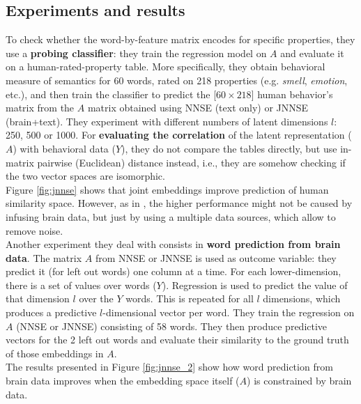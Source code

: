 \subsection{Experiments and results}
To check whether the word-by-feature matrix encodes for specific properties, they use a \textbf{probing classifier}: they train the regression model on $A$ and evaluate it on a human-rated-property table. More specifically, they obtain behavioral measure of semantics for 60 words, rated on 218 properties (e.g. \textit{smell}, \textit{emotion}, etc.), and then train the classifier to predict the [$60 \times 218$] human behavior's matrix from the $A$ matrix obtained using NNSE (text only) or JNNSE (brain+text). They experiment with different numbers of latent dimensions $l$: 250, 500 or 1000. For \textbf{evaluating the correlation} of the latent representation ($A$) with behavioral data ($Y$), they do not compare the tables directly, but use in-matrix pairwise (Euclidean) distance instead, i.e., they are somehow checking if the two vector spaces are isomorphic.\\
Figure \ref{fig:jnnse} shows that joint embeddings improve prediction of human similarity space. However, as in \cite{fong2017using}, the higher performance might not be caused by infusing brain data, but just by using a multiple data sources, which allow to remove noise.\\

Another experiment they deal with consists in \textbf{word prediction from brain data}. The matrix $A$ from NNSE or JNNSE is used as outcome variable: they predict it (for left out words) one column at a time. For each lower-dimension, there is a set of values over words ($Y$).
Regression is used to predict the value of that dimension $l$ over the $Y$ words. This is repeated for all $l$ dimensions, which produces a predictive $l$-dimensional vector per word. They train the regression on $A$ (NNSE or JNNSE) consisting of 58 words. They then produce predictive vectors for the 2 left out words and evaluate their similarity to the ground truth of those embeddings in $A$.\\
The results presented in Figure \ref{fig:jnnse_2} show how word prediction from brain data improves when the embedding space itself ($A$) is constrained by brain data.

